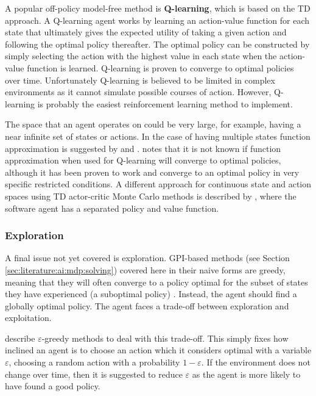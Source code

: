 A popular off-policy model-free method is \textbf{Q-learning}, which is based
on the TD approach. A Q-learning agent works by learning an action-value
function for each state that ultimately gives the expected utility of taking a
given action and following the optimal policy thereafter. The optimal policy
can be constructed by simply selecting the action with the highest value in
each state when the action-value function is learned. Q-learning is proven to
converge to optimal policies over time. Unfortunately Q-learning is believed to
be limited in complex environments as it cannot simulate possible courses of
action. However, Q-learning is probably the easiest reinforcement learning
method to implement. \parencite{Russell2010ai+modern}

The space that an agent operates on could be very large, for example, having a
near infinite set of states or actions. In the case of having multiple states
function approximation is suggested by \textcite{Sutton1998ai+reinforcement}
and \textcite{Russell2010ai+modern}. \textcite{Szepesvari2010ai+algorithms}
notes that it is not known if function approximation when used for Q-learning
will converge to optimal policies, although it has been proven to work and
converge to an optimal policy in very specific restricted conditions. A
different approach for continuous state and action spaces using TD actor-critic
Monte Carlo methods is described by \textcite{Lazaric2008ai+smc}, where the
software agent has a separated policy and value function.


\subsubsection{Exploration}
\label{sec:literature:ai:exploration}

A final issue not yet covered is exploration. GPI-based methods (see Section
\ref{sec:literature:ai:mdp:solving}) covered here in their naive forms are greedy,
meaning that they will often converge to a policy optimal for the subset of
states they have experienced (a suboptimal policy)
\parencite{Russell2010ai+modern}. Instead, the agent should find a globally
optimal policy. The agent faces a trade-off between exploration and
exploitation. 

\textcite{Sutton1998ai+reinforcement} describe \(\varepsilon\)-greedy methods
to deal with this trade-off. This simply fixes how inclined an agent is to
choose an action which it considers optimal with a variable \(\varepsilon\),
choosing a random action with a probability \(1 - \varepsilon\). If the
environment does not change over time, then it is suggested to reduce
\(\varepsilon\) as the agent is more likely to have found a good policy.

